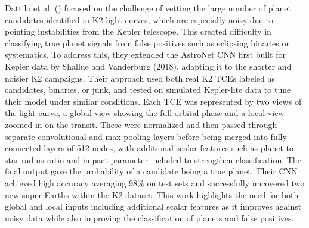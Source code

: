 \documentclass[letterpaper]{article} %
\begin{document}
Dattilo et al. (\citeyear{Dattilo2019identifyexoplanetsII}) focused on the challenge of vetting the large number of planet candidates identified in K2 light curves, which are especially noisy due to pointing instabilities from the Kepler telescope. This created difficulty in classifying true planet signals from false positives such as eclipsing binaries or systematics. To address this, they extended the AstroNet CNN first built for Kepler data by Shallue and Vanderburg (2018), adapting it to the shorter and noisier K2 campaigns. Their approach used both real K2 TCEs labeled as candidates, binaries, or junk, and tested on simulated Kepler-lite data to tune their model under similar conditions. Each TCE was represented by two views of the light curve, a global view showing the full orbital phase and a local view zoomed in on the transit. These were normalized and then passed through separate convolutional and max pooling layers before being merged into fully connected layers of 512 nodes, with additional scalar features such as planet-to-star radius ratio and impact parameter included to strengthen classification. The final output gave the probability of a candidate being a true planet. Their CNN achieved high accuracy averaging 98\% on test sets and successfully uncovered two new super-Earths within the K2 dataset. This work highlights the need for both global and local inputs including additional scalar features as it improves against noisy data while also improving the classification of planets and false positives.
\end{document}
